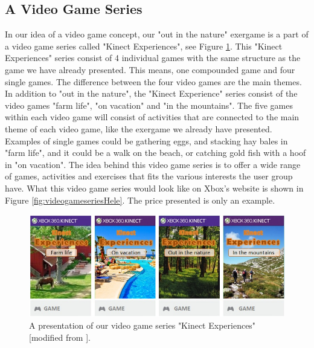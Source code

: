\subsection{A Video Game Series}
In our idea of a video game concept, our "out in the nature" exergame is a part of a video game series called "Kinect Experiences", see Figure \ref{fig:videogameseriesAlone}. This "Kinect Experiences" series consist of 4 individual games with the same structure as the game we have already presented. This means, one compounded game and four single games. The difference between the four video games are the main themes. In addition to "out in the nature", the "Kinect Experience" series consist of the video games "farm life", "on vacation" and "in the mountains". The five games within each video game will consist of activities that are connected to the main theme of each video game, like the exergame we already have presented. Examples of single games could be gathering eggs, and stacking hay bales in "farm life", and it could be a walk on the beach, or catching gold fish with a hoof in "on vacation". The idea behind this video game series is to offer a wide range of games, activities and exercises that fits the various interests the user group have. What this video game series would look like on Xbox's website is shown in Figure \ref{fig:videogameseriesHele}. The price presented is only an example. 

\begin{figure} [H]
\centering
\includegraphics[scale=0.65]{videoGameSeriesAlone.jpg}
\caption[Presentation of our video game series]{A presentation of our video game series "Kinect Experiences" [modified from \cite{XboxNettside}].}
\label{fig:videogameseriesAlone}
\end{figure}

